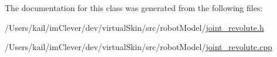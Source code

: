 The documentation for this class was generated from the following files:\begin{DoxyCompactItemize}
\item 
/Users/kail/imClever/dev/virtualSkin/src/robotModel/\hyperlink{joint__revolute_8h}{joint\_\-revolute.h}\item 
/Users/kail/imClever/dev/virtualSkin/src/robotModel/\hyperlink{joint__revolute_8cpp}{joint\_\-revolute.cpp}\end{DoxyCompactItemize}
